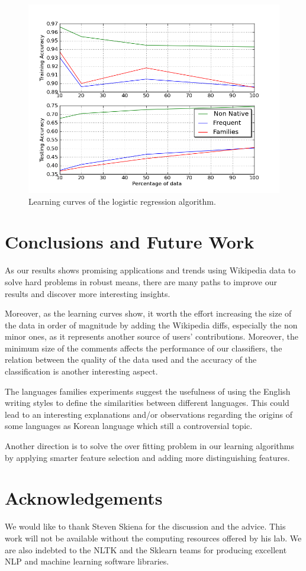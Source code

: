 \documentclass[10pt,a5paper,twoside]{article}
\begin{document}
\begin{figure}[t]
\centering
\includegraphics[scale=0.45]{combined_lc.png}
\caption{Learning curves of the logistic regression algorithm.}
\label{comb_lc}
\end{figure}


\section*{Conclusions and Future Work}
\label{conc}
As our results shows promising applications and trends using Wikipedia data to solve hard problems in robust means, there are many paths to improve our results and discover more interesting insights.

Moreover, as the learning curves show, it worth the effort increasing the size
of the data in order of magnitude by adding the Wikipedia diffs, especially the
non minor ones, as it represents another source of users' contributions. Moreover, the minimum size of the comments affects the performance of our classifiers, the relation between the quality of the data used and the accuracy of the classification is another interesting aspect.

The languages families experiments suggest the usefulness of using the English writing styles to define the similarities between different languages. This could lead to an interesting explanations and/or observations regarding the origins of some languages as Korean language which still a controversial topic.

Another direction is to solve the over fitting problem in our learning algorithms by applying smarter feature selection and adding more distinguishing features.

\section*{Acknowledgements}
We would like to thank Steven Skiena for the discussion and the advice. This
work will not be available without the computing resources offered by his lab.
We are also indebted to the NLTK and the Sklearn teams for producing excellent
NLP and machine learning software libraries.

{}

\end{document}
